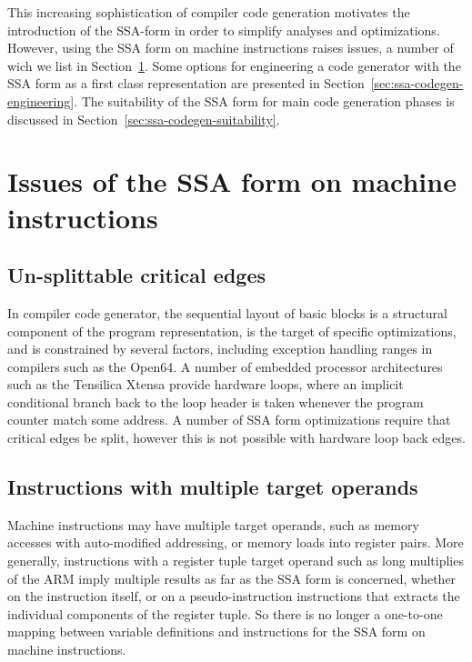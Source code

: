 This increasing sophistication of compiler code generation motivates the
introduction of the SSA-form in order to simplify analyses and optimizations.
However, using the SSA form on machine instructions raises issues, a number of
wich we list in Section~\ref{sec:ssa-codegen-issues}.  Some options for
engineering a code generator with the SSA form as a first class representation
are presented in Section~\ref{sec:ssa-codegen-engineering}.  The suitability of
the SSA form for main code generation phases is discussed in
Section~\ref{sec:ssa-codegen-suitability}.

\section{Issues of the SSA form on machine instructions}
\label{sec:ssa-codegen-issues}

\subsection{Un-splittable critical edges}

In compiler code generator, the sequential layout of basic blocks is a
structural component of the program representation, is the target of specific
optimizations, and is constrained by several factors, including exception
handling ranges in compilers such as the Open64. A number of embedded processor
architectures such as the Tensilica Xtensa provide hardware loops, where an
implicit conditional branch back to the loop header is taken whenever the
program counter match some address. A number of SSA form optimizations require
that critical edges be split, however this is not possible with hardware loop
back edges.

\subsection{Instructions with multiple target operands}

Machine instructions may have multiple target operands, such as memory
accesses with auto-modified addressing, or memory loads into register pairs.
More generally, instructions with a register tuple target operand such as long
multiplies of the ARM imply multiple results as far as the SSA form is
concerned, whether on the instruction itself, or on a pseudo-instruction
instructions that extracts the individual components of the register tuple. So
there is no longer a one-to-one mapping between variable definitions and
instructions for the SSA form on machine instructions.

